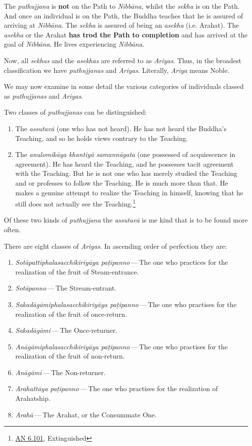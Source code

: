 The \emph{puthujjana} is \textbf{not} on the Path to \emph{Nibbāna}, whilst the \emph{sekha} is on the Path. And once an individual is on the Path, the Buddha teaches that he is assured of arriving at \emph{Nibbāna}. The \emph{sekha} is assured of being an \emph{asekha} (i.e. Arahat). The \emph{asekha} or the Arahat \textbf{has trod the Path to completion} and has arrived at the goal of \emph{Nibbāna}. He lives experiencing \emph{Nibbāna}.

Now, all \emph{sekhas} and the \emph{asekhas} are referred to as \emph{Ariyas}. Thus, in the broadest classification we have \emph{puthujjanas} and \emph{Ariyas}. Literally, \emph{Ariya} means Noble.

We may now examine in some detail the various categories of individuals classed as \emph{puthujjanas} and \emph{Ariyas}.

Two classes of \emph{puthujjanas} can be distinguished:

\begin{enumerate}
\def\labelenumi{\arabic{enumi}.}
\item
  The \emph{assutavā} (one who has not heard). He has not heard the Buddha's Teaching, and so he holds views contrary to the Teaching.
\item
  The \emph{anulomikāya khantiyā samannāgata} (one possessed of acquiescence in agreement). He has heard the Teaching, and he possesses tacit agreement with the Teaching. But he is not one who has merely studied the Teaching and or professes to follow the Teaching. He is much more than that. He makes a genuine attempt to realize the Teaching in himself, knowing that he still does not actually see the Teaching.\footnote{\href{https://suttacentral.net/an6.101/en/sujato}{AN 6.101}, Extinguished}
\end{enumerate}

Of these two kinds of \emph{puthujjana} the \emph{assutavā} is me kind that is to be found more often.

There are eight classes of \emph{Ariyas}. In ascending order of perfection they are:

\begin{enumerate}
\def\labelenumi{\arabic{enumi}.}
\item
  \emph{Sotāpattiphalasacchikiriyāya paṭipanno} --- The one who practices for the realization of the fruit of Steam-entrance.
\item
  \emph{Sotāpanno} --- The Stream-entrant.
\item
  \emph{Sakadāgāmiphalasacchikiriyāya paṭipanno} --- The one who practises for the realization of the fruit of once-return.
\item
  \emph{Sakadāgāmi} --- The Once-returner.
\item
  \emph{Anāgāmiphalasacchikiriyāya paṭipanno} --- The one who practises for the realization of the fruit of non-return.
\item
  \emph{Anāgāmi} --- The Non-returner.
\item
  \emph{Arahattāya paṭipanno} --- The one who practises for the realization of Arahatship.
\item
  \emph{Arahā} --- The Arahat, or the Consummate One.
\end{enumerate}

